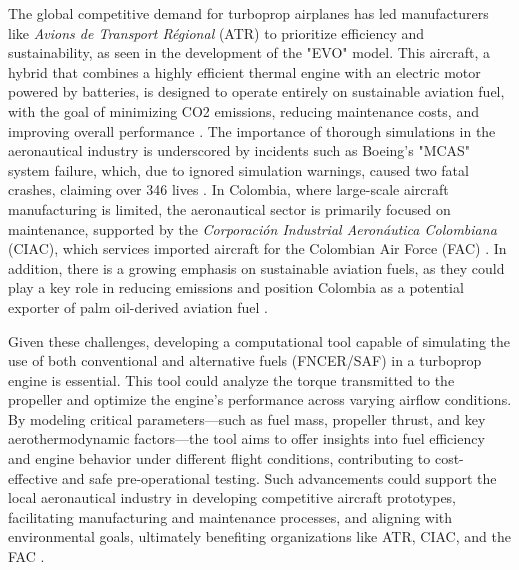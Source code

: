 \documentclass{Format}
\begin{document}
The global competitive demand for turboprop airplanes has led manufacturers like \textit{Avions de Transport Régional} (ATR) to prioritize efficiency and sustainability, as seen in the development of the "EVO" model. This aircraft, a hybrid that combines a highly efficient thermal engine with an electric motor powered by batteries, is designed to operate entirely on sustainable aviation fuel, with the goal of minimizing CO2 emissions, reducing maintenance costs, and improving overall performance \cite{ATREVOConcept}. The importance of thorough simulations in the aeronautical industry is underscored by incidents such as Boeing's "MCAS" system failure, which, due to ignored simulation warnings, caused two fatal crashes, claiming over 346 lives \cite{FrontlinePBSBoeing}. In Colombia, where large-scale aircraft manufacturing is limited, the aeronautical sector is primarily focused on maintenance, supported by the \textit{Corporación Industrial Aeronáutica Colombiana} (CIAC), which services imported aircraft for the Colombian Air Force (FAC) \cite{SemanaCIAC}. In addition, there is a growing emphasis on sustainable aviation fuels, as they could play a key role in reducing emissions and position Colombia as a potential exporter of palm oil-derived aviation fuel \cite{BonillaBiocombustibles} \cite{SanchezAceitePalma}.

Given these challenges, developing a computational tool capable of simulating the use of both conventional and alternative fuels (FNCER/SAF) in a turboprop engine is essential. This tool could analyze the torque transmitted to the propeller and optimize the engine's performance across varying airflow conditions. By modeling critical parameters—such as fuel mass, propeller thrust, and key aerothermodynamic factors—the tool aims to offer insights into fuel efficiency and engine behavior under different flight conditions, contributing to cost-effective and safe pre-operational testing. Such advancements could support the local aeronautical industry in developing competitive aircraft prototypes, facilitating manufacturing and maintenance processes, and aligning with environmental goals, ultimately benefiting organizations like ATR, CIAC, and the FAC \cite{QuinteroPoliticaAerea}.

\end{document}
